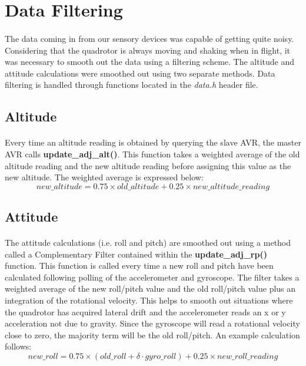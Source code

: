 \section{Data Filtering}

\paragraph{}
The data coming in from our sensory devices was capable of getting quite noisy.  Considering that the quadrotor is always moving and shaking when in flight, it was necessary to smooth out the data using a filtering scheme.  The altitude and attitude calculations were smoothed out using two separate methods.  Data filtering is handled through functions located in the {\it data.h} header file.

\subsection{Altitude}

\paragraph{}
Every time an altitude reading is obtained by querying the slave AVR, the master AVR calls {\bf update\_adj\_alt()}.  This function takes a weighted average of the old altitude reading and the new altitude reading before assigning this value as the new altitude.  The weighted average is expressed below:
\begin{equation}
new\_altitude = 0.75 \times old\_altitude + 0.25 \times new\_altitude\_reading
\end{equation}

\subsection{Attitude \label{attitude}}

\paragraph{}
The attitude calculations (i.e. roll and pitch) are smoothed out using a method called a Complementary Filter contained within the {\bf update\_adj\_rp()} function.  This function is called every time a new roll and pitch have been calculated following polling of the accelerometer and gyroscope.  The filter takes a weighted average of the new roll/pitch value and the old roll/pitch value plus an integration of the rotational velocity.  This helps to smooth out situations where the quadrotor has acquired lateral drift and the accelerometer reads an x or y acceleration not due to gravity.  Since the gyroscope will read a rotational velocity close to zero, the majority term will be the old roll/pitch.  An example calculation follows:
\begin{equation}
new\_roll = 0.75 \times (old\_roll + \delta \cdot gyro\_roll) + 0.25 \times new\_roll\_reading
\end{equation}
